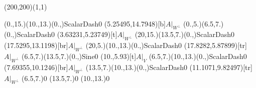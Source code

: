 \unitlength=1bp%

\begin{feynartspicture}(200,200)(1,1)

\FADiagram{}
\FAProp(0.,15.)(10.,13.)(0.,){ScalarDash}{0}
\FALabel(5.25495,14.7948)[b]{$A|_{W^\perp}$}
\FAProp(0.,5.)(6.5,7.)(0.,){ScalarDash}{0}
\FALabel(3.63231,5.23749)[t]{$A|_{W^\perp}$}
\FAProp(20,15.)(13.5,7.)(0.,){ScalarDash}{0}
\FALabel(17.5295,13.1198)[br]{$A|_{W^\perp}$}
\FAProp(20,5.)(10.,13.)(0.,){ScalarDash}{0}
\FALabel(17.8282,5.87899)[tr]{$A|_{W^\perp}$}
\FAProp(6.5,7.)(13.5,7.)(0.,){Sine}{0}
\FALabel(10.,5.93)[t]{$A|_V$}
\FAProp(6.5,7.)(10.,13.)(0.,){ScalarDash}{0}
\FALabel(7.69355,10.1246)[br]{$A|_{W^\perp}$}
\FAProp(13.5,7.)(10.,13.)(0.,){ScalarDash}{0}
\FALabel(11.1071,9.82497)[tr]{$A|_{W^\perp}$}
\FAVert(6.5,7.){0}
\FAVert(13.5,7.){0}
\FAVert(10.,13.){0}
\end{feynartspicture}

